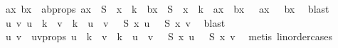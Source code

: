 \begin{isabellebody}
\ ax\ bx\ \ ab{\isacharunderscore}{\kern0pt}props{\isacharcolon}{\kern0pt}\ {\isachardoublequoteopen}ax\ {\isasymin}\ S\ {\isacharbackquote}{\kern0pt}\ x\ {\isacharbackquote}{\kern0pt}\ {\isacharbraceleft}{\kern0pt}{\isachardot}{\kern0pt}{\isachardot}{\kern0pt}k{\isacharbraceright}{\kern0pt}\ {\isasymand}\ bx\ {\isasymin}\ S\ {\isacharbackquote}{\kern0pt}\ x\ {\isacharbackquote}{\kern0pt}\ {\isacharbraceleft}{\kern0pt}{\isachardot}{\kern0pt}{\isachardot}{\kern0pt}k{\isacharbraceright}{\kern0pt}\ {\isasymand}\ ax\ {\isasymnoteq}\ bx\ {\isasymand}\ {\isasymchi}\ ax\ {\isacharequal}{\kern0pt}\ {\isasymchi}\ bx{\isachardoublequoteclose}\ \isamarkupfalse%
\ blast\isanewline
\ \ \isamarkupfalse%
\ \isamarkupfalse%
\ {\isachardoublequoteopen}{\isasymexists}u\ v{\isachardot}{\kern0pt}\ u\ {\isasymin}\ {\isacharbraceleft}{\kern0pt}{\isachardot}{\kern0pt}{\isachardot}{\kern0pt}k{\isacharbraceright}{\kern0pt}\ {\isasymand}\ v\ {\isasymin}\ {\isacharbraceleft}{\kern0pt}{\isachardot}{\kern0pt}{\isachardot}{\kern0pt}k{\isacharbraceright}{\kern0pt}\ {\isasymand}\ u\ {\isasymnoteq}\ v\ {\isasymand}\ {\isasymchi}\ {\isacharparenleft}{\kern0pt}S\ {\isacharparenleft}{\kern0pt}x\ u{\isacharparenright}{\kern0pt}{\isacharparenright}{\kern0pt}\ {\isacharequal}{\kern0pt}\ {\isasymchi}\ {\isacharparenleft}{\kern0pt}S\ {\isacharparenleft}{\kern0pt}x\ v{\isacharparenright}{\kern0pt}{\isacharparenright}{\kern0pt}{\isachardoublequoteclose}\ \isamarkupfalse%
\ blast\isanewline
\ \ \isamarkupfalse%
\ \isamarkupfalse%
\ u\ v\ \ uv{\isacharunderscore}{\kern0pt}props{\isacharcolon}{\kern0pt}\ {\isachardoublequoteopen}u\ {\isasymin}\ {\isacharbraceleft}{\kern0pt}{\isachardot}{\kern0pt}{\isachardot}{\kern0pt}k{\isacharbraceright}{\kern0pt}\ {\isasymand}\ v\ {\isasymin}\ {\isacharbraceleft}{\kern0pt}{\isachardot}{\kern0pt}{\isachardot}{\kern0pt}k{\isacharbraceright}{\kern0pt}\ {\isasymand}\ u\ {\isacharless}{\kern0pt}\ v\ {\isasymand}\ {\isasymchi}\ {\isacharparenleft}{\kern0pt}S\ {\isacharparenleft}{\kern0pt}x\ u{\isacharparenright}{\kern0pt}{\isacharparenright}{\kern0pt}\ {\isacharequal}{\kern0pt}\ {\isasymchi}\ {\isacharparenleft}{\kern0pt}S\ {\isacharparenleft}{\kern0pt}x\ v{\isacharparenright}{\kern0pt}{\isacharparenright}{\kern0pt}{\isachardoublequoteclose}\ \isamarkupfalse%
\ {\isacharparenleft}{\kern0pt}metis\ linorder{\isacharunderscore}{\kern0pt}cases{\isacharparenright}{\kern0pt}\isanewline
\isanewline
\ \ \isamarkupfalse%

\end{isabellebody}
